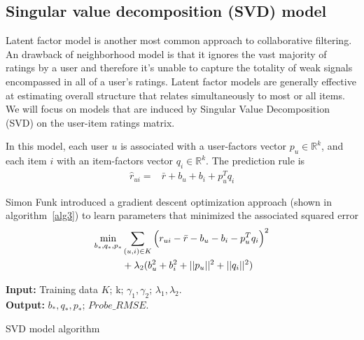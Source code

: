 \documentclass[journal]{IEEEtran}
\begin{document}
\subsection{Singular value decomposition (SVD) model}
Latent factor model is another most common approach to collaborative filtering. An drawback of neighborhood model is that it ignores the vast majority of ratings by a user and therefore it's unable to capture the totality of weak signals encompassed in all of a user\rq{}s ratings. Latent factor models are generally effective at estimating overall structure that relates simultaneously to most or all items.  We will focus on models that are induced by Singular Value Decomposition (SVD) on the user-item ratings matrix.

In this model, each user $u$ is associated with a user-factors vector $p_u \in \mathbb R^k$, and each item $i$ with an item-factors vector $q_i \in \mathbb R^k$. The prediction rule is
\begin{align}
\label{eq8}
\hat{r}_{ui} = & \bar{r} + b_u + b_i + p_u^T q_i
\end{align}

Simon Funk\cite{svd} introduced a gradient descent optimization approach (shown in algorithm~\ref{alg3}) to learn parameters that minimized the associated squared error 
\begin{align}
\label{eq9}
\min_{b_*, q_*, p_*}  & \sum_{(u,i) \in K} \Big( r_{ui} - \bar{r} - b_u - b_i - p_u^T q_i \Big)^2 \notag \\
& + \lambda_2 (b_u^2 + b_i^2 + ||p_u||^2 +  ||q_i||^2)
\end{align}

\begin{algorithm}[ht]
 \SetAlgoLined  %
 \textbf{Input:} {Training data $K$; k; $\gamma_1, \gamma_2$; $\lambda_1, \lambda_2$.} \\
 \textbf{Output:} {$b_*, q_*, p_*$; $Probe\_RMSE$.} \\

 \caption{SVD model algorithm}
\label{alg3}
\end{algorithm}
\end{document}
